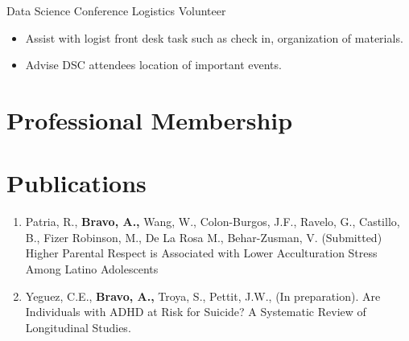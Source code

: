 \documentclass[11pt,a4paper,]{awesome-cv}
\begin{document}
\begin{cventries}
{\begin{cvitems}
\item Data Science Conference Logistics Volunteer
  \begin{itemize}
    \item Assist with logist front desk task such as check in, organization of materials.
    \item Advise DSC attendees location of important events.
  \end{itemize}
\end{cvitems}}
\end{cventries}

\section{Professional Membership}\label{professional-membership}

\begin{cventries}
    \vspace{-4.0mm}
    \vspace{-4.0mm}
    \vspace{-4.0mm}
\end{cventries}

\section{Publications}\label{publications}

\begin{enumerate}
\def\labelenumi{\arabic{enumi}.}
\item
  Patria, R., \textbf{Bravo, A.,} Wang, W., Colon-Burgos, J.F., Ravelo,
  G., Castillo, B., Fizer Robinson, M., De La Rosa M., Behar-Zusman, V.
  (Submitted) Higher Parental Respect is Associated with Lower
  Acculturation Stress Among Latino Adolescents
\item
  Yeguez, C.E., \textbf{Bravo, A.,} Troya, S., Pettit, J.W., (In
  preparation). Are Individuals with ADHD at Risk for Suicide? A
  Systematic Review of Longitudinal Studies.
\end{enumerate}


\label{LastPage}~
\end{document}
